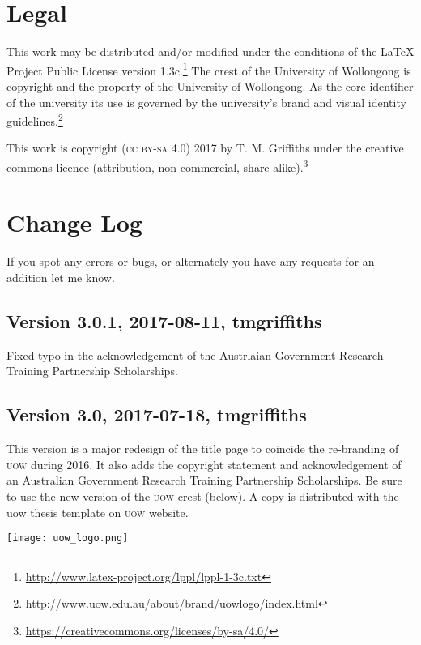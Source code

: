 \documentclass[12pt,oneside]{article}
\begin{document}
\section{Legal}
This work may be distributed and/or modified under the conditions of the \LaTeX{} Project Public License version 1.3c.\footnote{\url{http://www.latex-project.org/lppl/lppl-1-3c.txt}} The crest of the University of Wollongong is copyright and the property of the University of Wollongong. As the core identifier of the university its use is governed by the university's brand and visual identity guidelines.\footnote{\url{http://www.uow.edu.au/about/brand/uowlogo/index.html}}

This work is copyright (\textsc{cc by-sa 4.0}) 2017 by T. M. Griffiths under the creative commons licence (attribution, non-commercial, share alike).\footnote{\url{https://creativecommons.org/licenses/by-sa/4.0/}}

\begin{center}\color{UOWdarkblue}\ccbysa\end{center}

\clearpage

\section{Change Log}
If you spot any errors or bugs, or alternately you have any requests for an addition let me know.

\subsection*{Version 3.0.1, 2017-08-11, tmgriffiths}
Fixed typo in the acknowledgement of the Austrlaian Government Research Training Partnership Scholarships.

\subsection*{Version 3.0, 2017-07-18, tmgriffiths}
This version is a major redesign of the title page to coincide the re-branding of \textsc{uow} during 2016. It also adds the copyright statement and acknowledgement of an Australian Government Research Training Partnership Scholarships. Be sure to use the new version of the \textsc{uow} crest (below). A copy is distributed with the uow thesis template on \textsc{uow} website.
\begin{center}
  \texttt{[image: uow\_logo.png]}
\end{center}
\end{document}
